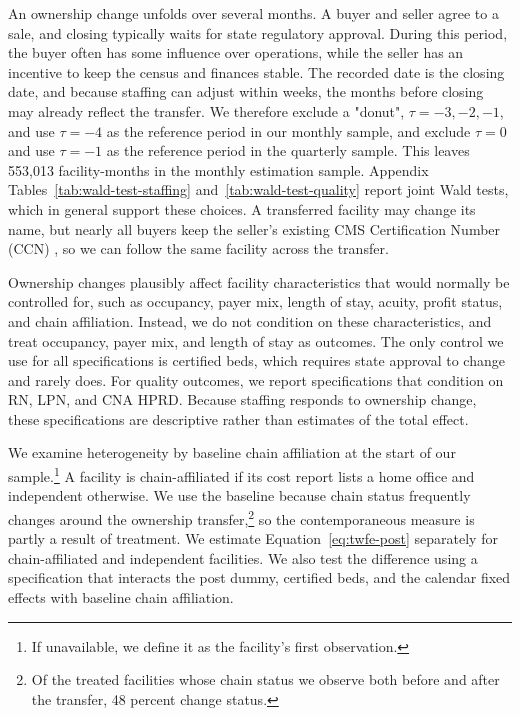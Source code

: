 \documentclass[12pt]{article}
\begin{document}
An ownership change unfolds over several months. A buyer and seller agree to a sale, and closing typically waits for state regulatory approval. During this period, the buyer often has some influence over operations, while the seller has an incentive to keep the census and finances stable. The recorded date is the closing date, and because staffing can adjust within weeks, the months before closing may already reflect the transfer. We therefore exclude a "donut", \(\tau=-3,-2,-1\), and use \(\tau=-4\) as the reference period in our monthly sample, and exclude \(\tau=0\) and use \(\tau=-1\) as the reference period in the quarterly sample. This leaves 553,013 facility-months in the monthly estimation sample. Appendix Tables~\ref{tab:wald-test-staffing} and~\ref{tab:wald-test-quality} report joint Wald tests, which in general support these choices. A transferred facility may change its name, but nearly all buyers keep the seller's existing CMS Certification Number (CCN) \citep{CMS2024AppendixPP, eCFR42CFR489.18}, so we can follow the same facility across the transfer.

Ownership changes plausibly affect facility characteristics that would normally be controlled for, such as occupancy, payer mix, length of stay, acuity, profit status, and chain affiliation. Instead, we do not condition on these characteristics, and treat occupancy, payer mix, and length of stay as outcomes. The only control we use for all specifications is certified beds, which requires state approval to change and rarely does. For quality outcomes, we report specifications that condition on RN, LPN, and CNA HPRD. Because staffing responds to ownership change, these specifications are descriptive rather than estimates of the total effect.

We examine heterogeneity by baseline chain affiliation at the start of our sample.\footnote{If unavailable, we define it as the facility's first observation.} A facility is chain-affiliated if its cost report lists a home office and independent otherwise. We use the baseline because chain status frequently changes around the ownership transfer,\footnote{Of the treated facilities whose chain status we observe both before and after the transfer, 48 percent change status.} so the contemporaneous measure is partly a result of treatment. We estimate Equation~\ref{eq:twfe-post} separately for chain-affiliated and independent facilities. We also test the difference using a specification that interacts the post dummy, certified beds, and the calendar fixed effects with baseline chain affiliation.
\end{document}
